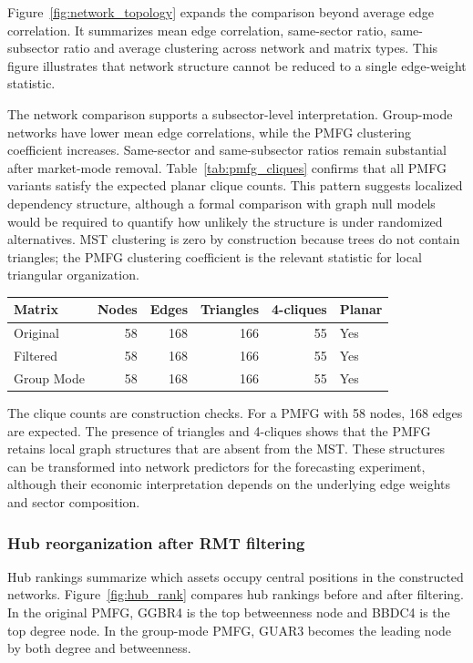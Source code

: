 Figure~\ref{fig:network_topology} expands the comparison beyond average edge correlation. It summarizes mean edge correlation, same-sector ratio, same-subsector ratio and average clustering across network and matrix types. This figure illustrates that network structure cannot be reduced to a single edge-weight statistic.

The network comparison supports a subsector-level interpretation. Group-mode networks have lower mean edge correlations, while the PMFG clustering coefficient increases. Same-sector and same-subsector ratios remain substantial after market-mode removal. Table~\ref{tab:pmfg_cliques} confirms that all PMFG variants satisfy the expected planar clique counts. This pattern suggests localized dependency structure, although a formal comparison with graph null models would be required to quantify how unlikely the structure is under randomized alternatives. MST clustering is zero by construction because trees do not contain triangles; the PMFG clustering coefficient is the relevant statistic for local triangular organization.

\begin{center}
\label{tab:pmfg_cliques}
\begin{tabular}{lrrrrl}
\toprule
Matrix & Nodes & Edges & Triangles & 4-cliques & Planar \\
\midrule
Original & 58 & 168 & 166 & 55 & Yes \\
Filtered & 58 & 168 & 166 & 55 & Yes \\
Group Mode & 58 & 168 & 166 & 55 & Yes \\
\bottomrule
\end{tabular}
\end{center}

The clique counts are construction checks. For a PMFG with 58 nodes, 168 edges are expected. The presence of triangles and 4-cliques shows that the PMFG retains local graph structures that are absent from the MST. These structures can be transformed into network predictors for the forecasting experiment, although their economic interpretation depends on the underlying edge weights and sector composition.

\subsubsection{Hub reorganization after RMT filtering}

Hub rankings summarize which assets occupy central positions in the constructed networks. Figure~\ref{fig:hub_rank} compares hub rankings before and after filtering. In the original PMFG, GGBR4 is the top betweenness node and BBDC4 is the top degree node. In the group-mode PMFG, GUAR3 becomes the leading node by both degree and betweenness.

